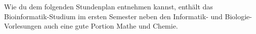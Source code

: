 Wie du dem folgenden Stundenplan entnehmen kannst, enthält das Bioinformatik-Studium im ersten
Semester neben den Informatik- und Biologie-Vorlesungen auch eine gute Portion Mathe und Chemie.
\vspace{-1cm}
\begin{center}


\end{center}
